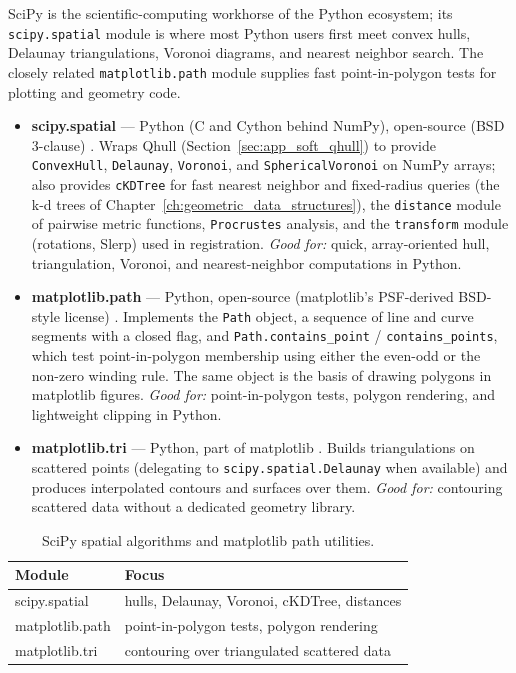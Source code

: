 SciPy is the scientific-computing workhorse of the Python ecosystem; its
\texttt{scipy.spatial} module is where most Python users first meet
convex hulls, Delaunay triangulations, Voronoi diagrams, and nearest
neighbor search. The closely related \texttt{matplotlib.path} module
supplies fast point-in-polygon tests for plotting and geometry code.

\begin{itemize}
  \item \textbf{scipy.spatial} --- Python (C and Cython behind NumPy),
    open-source (BSD 3-clause) \cite{scipy}. Wraps Qhull
    (Section~\ref{sec:app_soft_qhull}) to provide \texttt{ConvexHull},
    \texttt{Delaunay}, \texttt{Voronoi}, and \texttt{SphericalVoronoi}
    on NumPy arrays; also provides \texttt{cKDTree} for fast nearest
    neighbor and fixed-radius queries (the k-d trees of
    Chapter~\ref{ch:geometric_data_structures}), the \texttt{distance}
    module of pairwise metric functions, \texttt{Procrustes} analysis,
    and the \texttt{transform} module (rotations, Slerp) used in
    registration. \emph{Good for:} quick, array-oriented hull,
    triangulation, Voronoi, and nearest-neighbor computations in Python.
  \item \textbf{matplotlib.path} --- Python, open-source (matplotlib's
    PSF-derived BSD-style license) \cite{matplotlib}. Implements the
    \texttt{Path} object, a sequence of line and curve segments with a
    closed flag, and \texttt{Path.contains\_point} /
    \texttt{contains\_points}, which test point-in-polygon membership
    using either the even-odd or the non-zero winding rule. The same
    object is the basis of drawing polygons in matplotlib figures.
    \emph{Good for:} point-in-polygon tests, polygon rendering, and
    lightweight clipping in Python.
  \item \textbf{matplotlib.tri} --- Python, part of matplotlib
    \cite{matplotlib}. Builds triangulations on scattered points
    (delegating to \texttt{scipy.spatial.Delaunay} when available) and
    produces interpolated contours and surfaces over them.
    \emph{Good for:} contouring scattered data without a dedicated
    geometry library.
\end{itemize}

\begin{table}[ht]
\centering
\begin{tabular}{ll}
\hline
\textbf{Module} & \textbf{Focus} \\
\hline
scipy.spatial & hulls, Delaunay, Voronoi, cKDTree, distances \\
matplotlib.path & point-in-polygon tests, polygon rendering \\
matplotlib.tri & contouring over triangulated scattered data \\
\hline
\end{tabular}
\caption{SciPy spatial algorithms and matplotlib path utilities.}
\label{tbl:appsoft_scipy}
\end{table}

